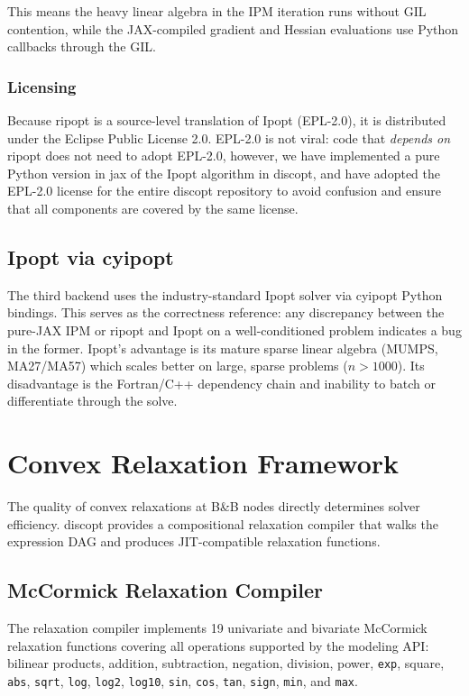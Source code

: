 \documentclass[12pt,preprint]{article}
\begin{document}
This means the heavy linear algebra in the IPM iteration runs without GIL contention, while the JAX-compiled gradient and Hessian evaluations use Python callbacks through the GIL.

\subsubsection{Licensing}
\label{org-licensing}
Because ripopt is a source-level translation of Ipopt (EPL-2.0), it is distributed under the Eclipse Public License 2.0. EPL-2.0 is not viral: code that \textit{depends on} ripopt does not need to adopt EPL-2.0, however, we have implemented a pure Python version in jax of the Ipopt algorithm in discopt, and have adopted the EPL-2.0 license for the entire discopt repository to avoid confusion and ensure that all components are covered by the same license.

\subsection{Ipopt via cyipopt}
\label{org-ipopt-via-cyipopt}
The third backend uses the industry-standard Ipopt solver \cite{Wachter2006} via cyipopt Python bindings. This serves as the correctness reference: any discrepancy between the pure-JAX IPM or ripopt and Ipopt on a well-conditioned problem indicates a bug in the former. Ipopt's advantage is its mature sparse linear algebra (MUMPS, MA27/MA57) which scales better on large, sparse problems ($n > 1000$). Its disadvantage is the Fortran/C++ dependency chain and inability to batch or differentiate through the solve.


\section{Convex Relaxation Framework}
\label{org-convex-relaxation-framework}
The quality of convex relaxations at B\&B nodes directly determines solver efficiency. discopt provides a compositional relaxation compiler that walks the expression DAG and produces JIT-compatible relaxation functions.

\subsection{McCormick Relaxation Compiler}
\label{org-mccormick-relaxation-compiler}
The relaxation compiler implements 19 univariate and bivariate McCormick relaxation functions \cite{McCormick1976,Tsoukalas2014} covering all operations supported by the modeling API: bilinear products, addition, subtraction, negation, division, power, \texttt{exp}, square, \texttt{abs}, \texttt{sqrt}, \texttt{log}, \texttt{log2}, \texttt{log10}, \texttt{sin}, \texttt{cos}, \texttt{tan}, \texttt{sign}, \texttt{min}, and \texttt{max}.
\end{document}
